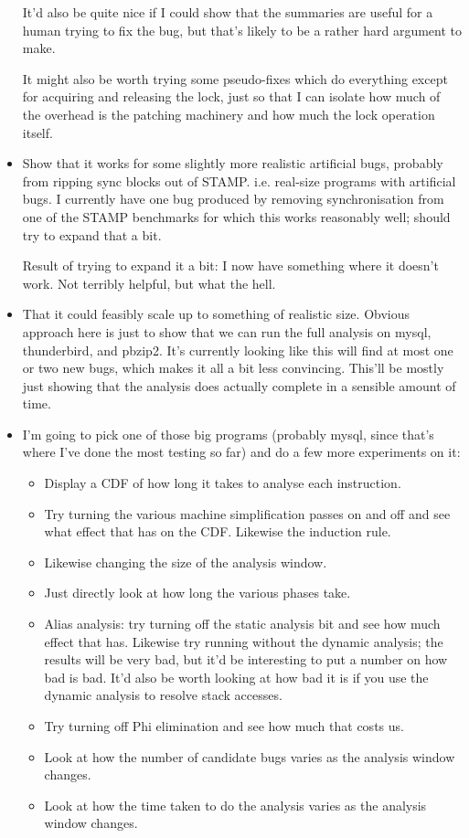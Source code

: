 \begin{itemize}
  It'd also be quite nice if I could show that the summaries are
  useful for a human trying to fix the bug, but that's likely to be a
  rather hard argument to make.

  It might also be worth trying some pseudo-fixes which do everything
  except for acquiring and releasing the lock, just so that I can
  isolate how much of the overhead is the patching machinery and how
  much the lock operation itself.

\item Show that it works for some slightly more realistic artificial
  bugs, probably from ripping sync blocks out of STAMP.
  i.e. real-size programs with artificial bugs.  I currently have one
  bug produced by removing synchronisation from one of the STAMP
  benchmarks for which this works reasonably well; should try to
  expand that a bit.

  Result of trying to expand it a bit: I now have something where it
  doesn't work.  Not terribly helpful, but what the hell.

\item That it could feasibly scale up to something of realistic size.
  Obvious approach here is just to show that we can run the full
  analysis on mysql, thunderbird, and pbzip2.  It's currently looking
  like this will find at most one or two new bugs, which makes it all
  a bit less convincing.  This'll be mostly just showing that the
  analysis does actually complete in a sensible amount of
  time.  

\item I'm going to pick one of those big programs (probably mysql,
  since that's where I've done the most testing so far) and do a few
  more experiments on it:

  \begin{itemize}
  \item Display a CDF of how long it takes to analyse each
    instruction.
  \item Try turning the various machine simplification passes on and
    off and see what effect that has on the CDF.  Likewise the
    induction rule.
  \item Likewise changing the size of the analysis window.
  \item Just directly look at how long the various phases
    take.
  \item Alias analysis: try turning off the static analysis bit and
    see how much effect that has.  Likewise try running without the
    dynamic analysis; the results will be very bad, but it'd be
    interesting to put a number on how bad is bad.  It'd also be worth
    looking at how bad it is if you use the dynamic analysis to
    resolve stack accesses.
  \item Try turning off Phi elimination and see how much that costs
    us.
  \item Look at how the number of candidate bugs varies as the
    analysis window changes.
  \item Look at how the time taken to do the analysis varies as the
    analysis window changes.
  \end{itemize}


\end{itemize}
